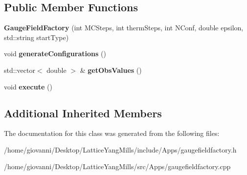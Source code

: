 \subsection*{Public Member Functions}
\begin{DoxyCompactItemize}
\item 
{\bfseries Gauge\+Field\+Factory} (int M\+C\+Steps, int therm\+Steps, int N\+Conf, double epsilon, std\+::string start\+Type)\hypertarget{classGaugeFieldFactory_ab4de95086757f8dad2bb82225990798c}{}\label{classGaugeFieldFactory_ab4de95086757f8dad2bb82225990798c}

\item 
void {\bfseries generate\+Configurations} ()\hypertarget{classGaugeFieldFactory_a44af20883686c17d5cc02b0017981a00}{}\label{classGaugeFieldFactory_a44af20883686c17d5cc02b0017981a00}

\item 
std\+::vector$<$ double $>$ \& {\bfseries get\+Obs\+Values} ()\hypertarget{classGaugeFieldFactory_a3455c32bf0d8e97c5b20a6372b108a42}{}\label{classGaugeFieldFactory_a3455c32bf0d8e97c5b20a6372b108a42}

\item 
void {\bfseries execute} ()\hypertarget{classGaugeFieldFactory_ae71b983ead390226ddad5d0f13aba0c6}{}\label{classGaugeFieldFactory_ae71b983ead390226ddad5d0f13aba0c6}

\end{DoxyCompactItemize}
\subsection*{Additional Inherited Members}


The documentation for this class was generated from the following files\+:\begin{DoxyCompactItemize}
\item 
/home/giovanni/\+Desktop/\+Lattice\+Yang\+Mills/include/\+Apps/gaugefieldfactory.\+h\item 
/home/giovanni/\+Desktop/\+Lattice\+Yang\+Mills/src/\+Apps/gaugefieldfactory.\+cpp\end{DoxyCompactItemize}
